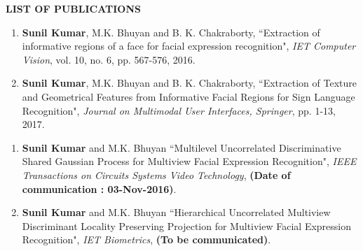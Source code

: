 \begin{center}
{\LARGE \bf LIST OF PUBLICATIONS}
\end{center}
\vspace{0.2in}

\renewcommand{\labelenumi}{\arabic{enumi}.}   %
\renewcommand{\theenumii}{\arabic{enumii}}
\renewcommand{\labelenumii}{\theenumii}
\begin{enumerate}
	\item {\label{IET2016}} {\bf Sunil Kumar}, M.K. Bhuyan and B. K. Chakraborty, ``Extraction of informative regions of a face for facial expression recognition", \emph{IET Computer Vision}, vol. 10, no. 6, pp. 567-576, 2016.
	
	\item {\label{JMUI2016}} {\bf Sunil Kumar}, M.K. Bhuyan and B. K. Chakraborty, ``Extraction of Texture and Geometrical Features from Informative Facial Regions for Sign Language Recognition", \emph{Journal on Multimodal User Interfaces, Springer}, pp. 1-13, 2017.
	
\end{enumerate}
\begin{enumerate}
	\item {\label{CSVT2017}} {\bf Sunil Kumar} and M.K. Bhuyan ``Multilevel Uncorrelated Discriminative Shared Gaussian Process for Multiview Facial Expression Recognition", \emph{IEEE Transactions on Circuits Systems Video Technology}, {\bfseries{(Date of communication : 03-Nov-2016)}}.
	
	\item  {\label{AC2017}} {\bf Sunil Kumar} and M.K. Bhuyan ``Hierarchical Uncorrelated Multiview Discriminant Locality Preserving Projection for Multiview Facial Expression Recognition", \emph{IET Biometrics}, {\bfseries{(To be communicated)}}.
	
\end{enumerate}
